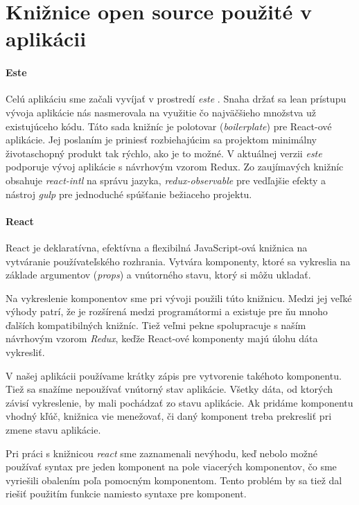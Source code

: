 \section{Knižnice open source použité v aplikácii}%

\label{sec:kniznice}

\paragraph{Este}
Celú aplikáciu sme začali vyvíjať v prostredí \emph{este} \cite{Este}. Snaha držať sa lean prístupu vývoja aplikácie nás nasmerovala na využitie čo najväčšieho množstva už existujúceho kódu. Táto sada knižníc je polotovar (\emph{boilerplate}) pre React-ové aplikácie. 
Jej poslaním je priniesť rozbiehajúcim sa projektom minimálny životaschopný produkt tak rýchlo, ako je to možné. V aktuálnej verzii \emph{este} podporuje vývoj aplikácie s návrhovým vzorom Redux. Zo zaujímavých knižníc obsahuje \emph{react-intl} na správu jazyka, \emph{redux-observable} pre vedľajšie efekty a nástroj \emph{gulp} pre jednoduché spúšťanie bežiaceho projektu.

\paragraph{React}
React \cite{react} je deklaratívna, efektívna a flexibilná JavaScript-ová knižnica na vytváranie používateľského rozhrania. Vytvára komponenty, ktoré sa vykreslia na základe argumentov (\emph{props}) a vnútorného stavu, ktorý si môžu ukladať. 

Na vykreslenie komponentov sme pri vývoji použili túto knižnicu. Medzi jej veľké výhody patrí, že je rozšírená medzi programátormi a existuje pre ňu mnoho ďalších kompatibilných knižníc. Tiež veľmi pekne spolupracuje s naším návrhovým vzorom \emph{Redux}, keďže React-ové komponenty majú úlohu dáta vykresliť.

V našej aplikácii používame krátky zápis pre vytvorenie takéhoto komponentu. Tiež sa snažíme nepoužívať vnútorný stav aplikácie. Všetky dáta, od ktorých závisí vykreslenie, by mali pochádzať zo stavu aplikácie. Ak pridáme komponentu vhodný kľúč, knižnica vie menežovať, či daný komponent treba prekresliť pri zmene stavu aplikácie.

Pri práci s knižnicou \emph{react} sme zaznamenali nevýhodu, keď nebolo možné používať syntax pre jeden komponent na pole viacerých komponentov, čo sme vyriešili obalením poľa pomocným komponentom. Tento problém by sa tiež dal riešiť použitím funkcie namiesto syntaxe pre komponent.

